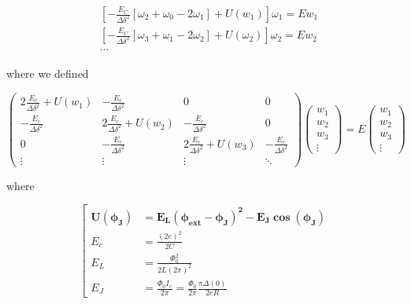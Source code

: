 \begin{equation}
  \begin{aligned}
    & \left[-\frac{E_C}{\Delta\delta^2}\left[\omega_{2}+\omega_{0}-2\omega_{1}\right] + U(w_1)\right]\omega_1 = Ew_1\\
    & \left[-\frac{E_C}{\Delta\delta^2}\left[\omega_{3}+\omega_{1}-2\omega_{2}\right] + U(\omega_2)\right]\omega_2 = Ew_2\\
    & \cdots
  \end{aligned}
\end{equation}

\noindent where we defined

\begin{framed}\noindent

  \begin{equation}\label{key}
    \begin{pmatrix}
      2\frac{E_c}{\Delta\delta^2} + U(w_1) & -\frac{E_c}{\Delta\delta^2} & 0 & 0 \\
      -\frac{E_c}{\Delta\delta^2} & 2\frac{E_c}{\Delta\delta^2} + U(w_2) &   -\frac{E_c}{\Delta\delta^2} & 0\\
      0 & -\frac{E_c}{\Delta\delta^2} & 2\frac{E_c}{\Delta\delta^2} + U(w_3) &   -\frac{E_c}{\Delta\delta^2}\\
      \vdots & \vdots & \vdots & \ddots
    \end{pmatrix}
    \begin{pmatrix}
      w_1\\w_2\\w_3\\\vdots
    \end{pmatrix}
    = E \begin{pmatrix}
      w_1\\w_2\\w_3\\\vdots
    \end{pmatrix}
  \end{equation}

  \noindent where

   \begin{equation}\label{key}
     \left[
       \begin{aligned}
         \mathbf{U(\phi_J)} & = \mathbf{E_L(\phi_\text{ext} - \phi_J)^2 - E_J\cos(\phi_J)}\\
         E_c & = \frac{(2e)^2}{2C}\\
         E_L & = \frac{\Phi_0^2}{2L(2\pi)^2}\\
         E_J         &         =        \frac{\Phi_0I_c}{2\pi}         =
         \frac{\Phi_0}{2\pi}\frac{\pi\Delta(0)}{2eR}
       \end{aligned}
     \right.
   \end{equation}
 \end{framed}

